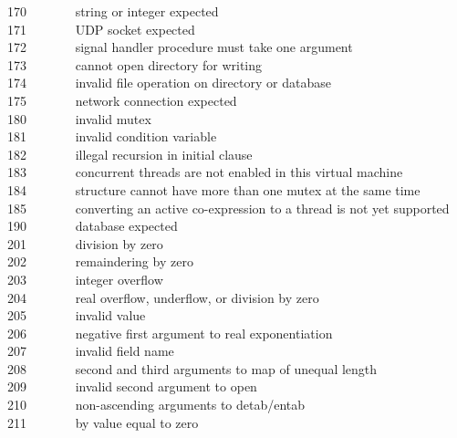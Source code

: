 170 \ \ \ \ \ \ \ string or integer expected\\
171 \ \ \ \ \ \ \ UDP socket expected\\
172 \ \ \ \ \ \ \ signal handler procedure must take one argument\\
173 \ \ \ \ \ \ \ cannot open directory for writing\\
174 \ \ \ \ \ \ \ invalid file operation on directory or database\\
175 \ \ \ \ \ \ \ network connection expected\\
180 \ \ \ \ \ \ \ invalid mutex\\
181 \ \ \ \ \ \ \ invalid condition variable\\
182 \ \ \ \ \ \ \ illegal recursion in initial clause\\
183 \ \ \ \ \ \ \ concurrent threads are not enabled in
this virtual machine\\
184 \ \ \ \ \ \ \ structure cannot have more than one mutex at 
the same time\\
185 \ \ \ \ \ \ \ converting an active co-expression to a thread
is not yet supported\\
190 \ \ \ \ \ \ \ database expected\\
201 \ \ \ \ \ \ \ division by zero\\
202 \ \ \ \ \ \ \ remaindering by zero\\
203 \ \ \ \ \ \ \ integer overflow\\
204 \ \ \ \ \ \ \ real overflow, underflow, or division by zero\\
205 \ \ \ \ \ \ \ invalid value\\
206 \ \ \ \ \ \ \ negative first argument to real exponentiation\\
207 \ \ \ \ \ \ \ invalid field name\\
208 \ \ \ \ \ \ \ second and third arguments to map of unequal
length\\
209 \ \ \ \ \ \ \ invalid second argument to open\\
210 \ \ \ \ \ \ \ non-ascending arguments to detab/entab\\
211 \ \ \ \ \ \ \ by value equal to zero\\
